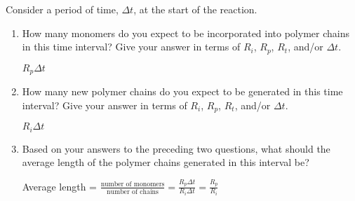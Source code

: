 \begin{activity}
\begin{ctqs}
\begin{enumerate}
				\begin{solution}[1.5in]\end{solution}
			
		\end{enumerate}
	
	\question Consider a period of time, $\Delta t$, at the start of the reaction.
	
		\begin{enumerate}
			
			\item How many monomers do you expect to be incorporated into polymer chains in this time interval?  Give your answer in terms of $R_i$, $R_p$, $R_t$, and/or $\Delta t$.
			
				\begin{solution}[0.5in]
				
					$R_p \Delta t$
					
				\end{solution}
			
			\item How many new polymer chains do you expect to be generated in this time interval?  Give your answer in terms of $R_i$, $R_p$, $R_t$, and/or $\Delta t$.
			
				\begin{solution}[0.5in]
				
					$R_i \Delta t$
					
				\end{solution}
			
			\item Based on your answers to the preceding two questions, what should the average length of the polymer chains generated in this interval be?
			
				\begin{solution}[0.5in]
				
					Average length = $\frac{\text{number of monomers}}{\text{number of chains}} = \frac{R_p\Delta t}{R_i \Delta t} = \frac{R_p}{R_i}$				
				
				\end{solution}
				
		\end{enumerate}
	

\end{ctqs}
\end{activity}
